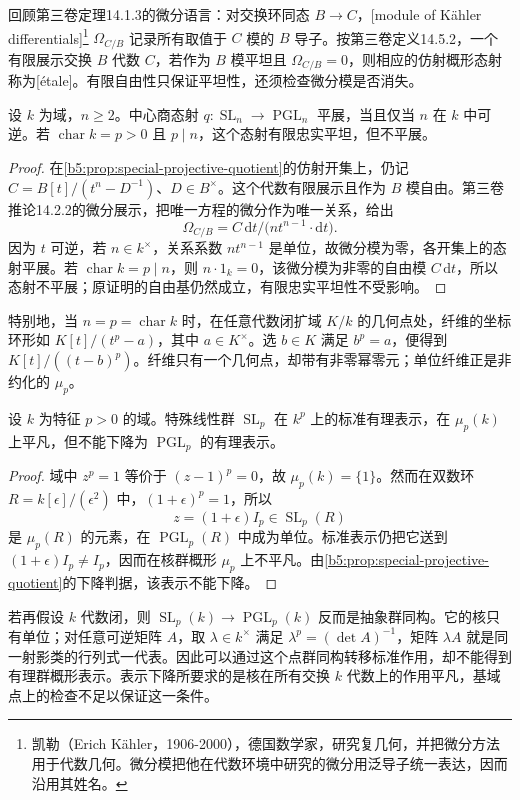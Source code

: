 回顾第三卷定理14.1.3的微分语言：对交换环同态 \(B\to C\)，[module of Kähler differentials]\footnote{凯勒（Erich Kähler，1906-2000），德国数学家，研究复几何，并把微分方法用于代数几何。微分模把他在代数环境中研究的微分用泛导子统一表达，因而沿用其姓名。} \(\Omega_{C/B}\) 记录所有取值于 \(C\) 模的 \(B\) 导子。按第三卷定义14.5.2，一个有限展示交换 \(B\) 代数 \(C\)，若作为 \(B\) 模平坦且 \(\Omega_{C/B}=0\)，则相应的仿射概形态射称为[étale]。有限自由性只保证平坦性，还须检查微分模是否消失。
\begin{corollary}\label{b5:cor:special-projective-etale}
	设 \(k\) 为域，\(n\ge2\)。中心商态射 \(q:\operatorname{SL}_n\to\operatorname{PGL}_n\) 平展，当且仅当 \(n\) 在 \(k\) 中可逆。若 \(\operatorname{char}k=p>0\) 且 \(p\mid n\)，这个态射有限忠实平坦，但不平展。
\end{corollary}
\begin{proof}
	在\cref{b5:prop:special-projective-quotient}的仿射开集上，仍记 \(C=B[t]/(t^n-D^{-1})\)、\(D\in B^\times\)。这个代数有限展示且作为 \(B\) 模自由。第三卷推论14.2.2的微分展示，把唯一方程的微分作为唯一关系，给出
	\[
		\Omega_{C/B}=C\,\mathrm{d}t/\bigl(nt^{n-1}\cdot\mathrm{d}t\bigr).
	\]
	因为 \(t\) 可逆，若 \(n\in k^\times\)，关系系数 \(nt^{n-1}\) 是单位，故微分模为零，各开集上的态射平展。若 \(\operatorname{char}k=p\mid n\)，则 \(n\cdot1_k=0\)，该微分模为非零的自由模 \(C\,\mathrm{d}t\)，所以态射不平展；原证明的自由基仍然成立，有限忠实平坦性不受影响。
\end{proof}
特别地，当 \(n=p=\operatorname{char}k\) 时，在任意代数闭扩域 \(K/k\) 的几何点处，纤维的坐标环形如 \(K[t]/(t^p-a)\)，其中 \(a\in K^\times\)。选 \(b\in K\) 满足 \(b^p=a\)，便得到 \(K[t]/((t-b)^p)\)。纤维只有一个几何点，却带有非零幂零元；单位纤维正是非约化的 \(\mu_p\)。
\begin{proposition}\label{b5:prop:standard-representation-nondescent}
	设 \(k\) 为特征 \(p>0\) 的域。特殊线性群 \(\operatorname{SL}_p\) 在 \(k^p\) 上的标准有理表示，在 \(\mu_p(k)\) 上平凡，但不能下降为 \(\operatorname{PGL}_p\) 的有理表示。
\end{proposition}
\begin{proof}
	域中 \(z^p=1\) 等价于 \((z-1)^p=0\)，故 \(\mu_p(k)=\{1\}\)。然而在双数环 \(R=k[\epsilon]/(\epsilon^2)\) 中，\((1+\epsilon)^p=1\)，所以
	\[
		z=(1+\epsilon)I_p\in\operatorname{SL}_p(R)
	\]
	是 \(\mu_p(R)\) 的元素，在 \(\operatorname{PGL}_p(R)\) 中成为单位。标准表示仍把它送到 \((1+\epsilon)I_p\ne I_p\)，因而在核群概形 \(\mu_p\) 上不平凡。由\cref{b5:prop:special-projective-quotient}的下降判据，该表示不能下降。
\end{proof}
若再假设 \(k\) 代数闭，则 \(\operatorname{SL}_p(k)\to\operatorname{PGL}_p(k)\) 反而是抽象群同构。它的核只有单位；对任意可逆矩阵 \(A\)，取 \(\lambda\in k^\times\) 满足 \(\lambda^p=(\det A)^{-1}\)，矩阵 \(\lambda A\) 就是同一射影类的行列式一代表。因此可以通过这个点群同构转移标准作用，却不能得到有理群概形表示。表示下降所要求的是核在所有交换 \(k\) 代数上的作用平凡，基域点上的检查不足以保证这一条件。
